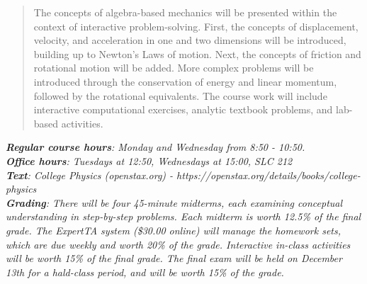 \documentclass[10pt]{article}
\begin{document}
\maketitle

\begin{abstract}
The concepts of algebra-based mechanics will be presented within the context of interactive problem-solving.  First, the concepts of displacement, velocity, and acceleration in one and two dimensions will be introduced, building up to Newton's Laws of motion.  Next, the concepts of friction and rotational motion will be added.  More complex problems will be introduced through the conservation of energy and linear momentum, followed by the rotational equivalents.  The course work will include interactive computational exercises, analytic textbook problems, and lab-based activities.
\end{abstract}
\noindent
\textit{\textbf{Regular course hours}: Monday and Wednesday from 8:50 - 10:50.} \\
\textit{\textbf{Office hours}: Tuesdays at 12:50, Wednesdays at 15:00, SLC 212} \\
\textit{\textbf{Text}: College Physics (openstax.org) -  https://openstax.org/details/books/college-physics} \\
\textit{\textbf{Grading}: There will be four 45-minute midterms, each examining conceptual understanding in step-by-step problems.  Each midterm is worth 12.5\% of the final grade.  The ExpertTA system (\$30.00 online) will manage the homework sets, which are due weekly and worth 20\% of the grade.  Interactive in-class activities will be worth 15\% of the final grade.  The final exam will be held on December 13th for a hald-class period, and will be worth 15\% of the grade.}
\end{document}
